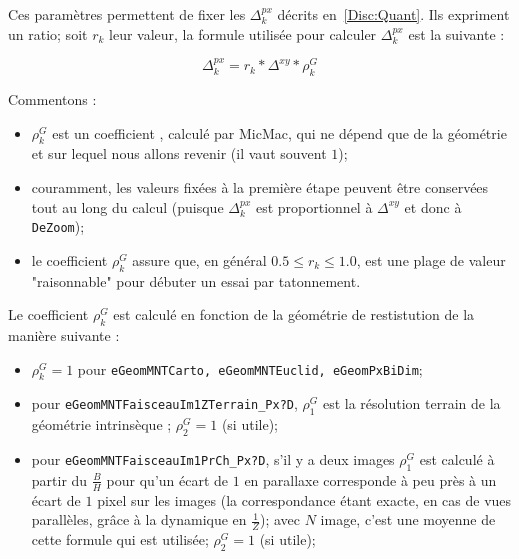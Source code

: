 Ces param\`etres  permettent de fixer les $\Delta^{px}_k$
d\'ecrits en~\ref{Disc:Quant}. Ils expriment un ratio;
soit $r_k$ leur valeur, la formule utilis\'ee pour calculer
$\Delta^{px}_k$ est la suivante :
 

\begin{equation}
   \Delta^{px}_k = r_k * \Delta^{xy} * \rho^G_k
\end{equation}


Commentons :

\begin{itemize}
   \item $\rho^G_k$ est un coefficient , calcul\'e par MicMac,
         qui ne d\'epend que de la g\'eom\'etrie et 
         sur lequel nous allons revenir (il vaut souvent $1$);

   \item  couramment, les valeurs fix\'ees \`a la premi\`ere \'etape
          peuvent \^etre conserv\'ees tout au long du calcul
          (puisque $\Delta^{px}_k$ est proportionnel \`a $\Delta^{xy}$
           et donc \`a {\tt DeZoom});

   \item le coefficient $\rho^G_k$ assure que, en g\'en\'eral $0.5 \leq r_k \leq 1.0$,
         est une plage de valeur "raisonnable" pour d\'ebuter un essai par
         tatonnement.
\end{itemize}

Le coefficient $\rho^G_k$ est calcul\'e 
en fonction de la g\'eom\'etrie de restistution 
de la mani\`ere suivante :



\begin{itemize}
   \item  $\rho^G_k=1$  pour {\tt eGeomMNTCarto, eGeomMNTEuclid, eGeomPxBiDim};

   \item  pour {\tt eGeomMNTFaisceauIm1ZTerrain\_Px?D}, $\rho^G_1$ est la r\'esolution
          terrain  de la g\'eom\'etrie intrins\`eque ; $\rho^G_2=1$ (si utile);

   \item  pour {\tt eGeomMNTFaisceauIm1PrCh\_Px?D}, s'il y a deux images $\rho^G_1$ 
          est calcul\'e \`a partir du $\frac{B}{H}$ pour qu'un 
          \'ecart de $1$ en parallaxe corresponde \`a peu pr\`es \`a un \'ecart de
           $1$ pixel sur les images (la correspondance \'etant exacte, en cas de vues 
           parall\`eles, gr\^ace \`a la dynamique en $\frac{1}{Z}$);
           avec $N$ image, c'est une moyenne de cette formule qui est utilis\'ee;
           $\rho^G_2=1$ (si utile);

\end{itemize}


